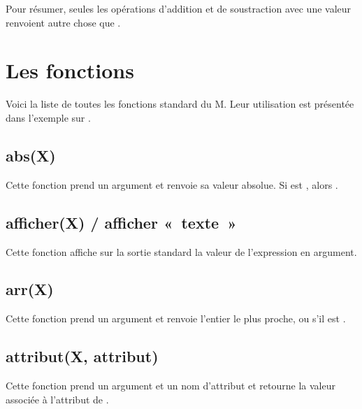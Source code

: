 \documentclass[letterpaper,10pt,french]{sphinxmanual}
\begin{document}
\sphinxAtStartPar
Pour résumer, seules les opérations d’addition et de soustraction avec une
valeur renvoient autre chose que .

\sphinxstepscope


\section{Les fonctions}
\label{\detokenize{fonctions:les-fonctions}}\label{\detokenize{fonctions:fonctions}}\label{\detokenize{fonctions::doc}}
\sphinxAtStartPar
Voici la liste de toutes les fonctions standard du M.
Leur utilisation est présentée dans l’exemple sur
{\hyperref[\detokenize{exemples/fonctions:exemples-fonctions}]{}}.


\subsection{abs(X)}
\label{\detokenize{fonctions:abs-x}}
\sphinxAtStartPar
Cette fonction prend un argument et renvoie sa valeur absolue.
Si  est , alors .


\subsection{afficher(X) / afficher « texte »}
\label{\detokenize{fonctions:afficher-x-afficher-texte}}
\sphinxAtStartPar
Cette fonction affiche sur la sortie standard la valeur de l’expression en argument.


\subsection{arr(X)}
\label{\detokenize{fonctions:arr-x}}
\sphinxAtStartPar
Cette fonction prend un argument et renvoie l’entier le plus
proche, ou  s’il est .


\subsection{attribut(X, attribut)}
\label{\detokenize{fonctions:attribut-x-attribut}}
\sphinxAtStartPar
Cette fonction prend un argument  et un nom d’attribut  et retourne
la valeur associée à l’attribut  de .
\end{document}
